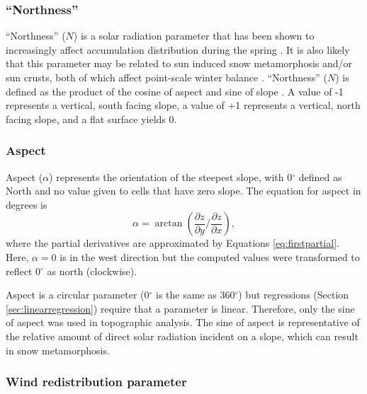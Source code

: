 \documentclass{sfuthesis}
\begin{document}
\subsubsection*{``Northness''} 

``Northness'' ($N$) is a solar radiation parameter that has been shown to  increasingly affect accumulation distribution during the spring \citep{Revuelto2014}. It is also likely that this parameter may be related to sun induced snow metamorphosis and/or sun crusts, both of which affect point-scale winter balance \citep{McGrath2015}. ``Northness'' ($N$) is defined as the product of the cosine of aspect and sine of slope \citep{Molotch2005}. A value of -1 represents a vertical, south facing slope, a value of +1 represents a vertical, north facing slope, and a flat surface yields 0. 

\subsubsection*{Aspect} 

Aspect ($\alpha$) represents the orientation of the steepest slope, with 0${^\circ}$ defined as North and no value given to cells that have zero slope. The equation for aspect in degrees is \citep{Neteler2008}
	\begin{equation}
	\alpha = \arctan\left(\frac{\partial z}{\partial y} \bigg/ \frac{\partial z}{\partial x}\right), 
	\end{equation}
where the partial derivatives are approximated by Equations \ref{eq:firstpartial}. Here, $\alpha = 0$ is in the west direction but the computed values were transformed to reflect 0${^\circ}$ as north (clockwise). 

Aspect is a circular parameter (0${^\circ}$ is the same as 360${^\circ}$) but regressions (Section \ref{sec:linearregression}) require that a parameter is linear. Therefore, only the sine of aspect was used in topographic analysis. The sine of aspect is representative of the relative amount of direct solar radiation incident on a slope, which can result in snow metamorphosis. 

\subsubsection*{Wind redistribution parameter} 
\end{document}
